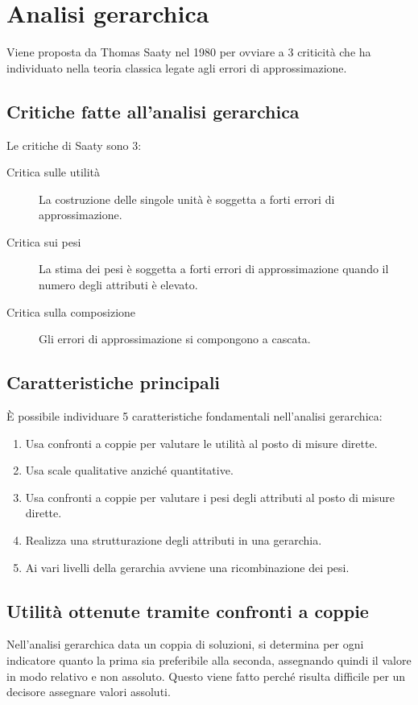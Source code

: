 \documentclass[\main/main.tex]{subfiles}
\begin{document}
\section{Analisi gerarchica}
Viene proposta da Thomas Saaty nel 1980 per ovviare a 3 criticità che ha individuato nella teoria classica legate agli errori di approssimazione.

\subsection{Critiche fatte all'analisi gerarchica}
Le critiche di Saaty sono 3:
\begin{description}
  \item[Critica sulle utilità] La costruzione delle singole unità è soggetta a forti errori di approssimazione.
  \item[Critica sui pesi] La stima dei pesi è soggetta a forti errori di approssimazione quando il numero degli attributi è elevato.
  \item[Critica sulla composizione] Gli errori di approssimazione si compongono a cascata.
\end{description}

\subsection{Caratteristiche principali}
È possibile individuare 5 caratteristiche fondamentali nell'analisi gerarchica:

\begin{enumerate}
  \item Usa confronti a coppie per valutare le utilità al posto di misure dirette.
  \item Usa scale qualitative anziché quantitative.
  \item Usa confronti a coppie per valutare i pesi degli attributi al posto di misure dirette.
  \item Realizza una strutturazione degli attributi in una gerarchia.
  \item Ai vari livelli della gerarchia avviene una ricombinazione dei pesi.
\end{enumerate}

\subsection{Utilità ottenute tramite confronti a coppie}
Nell'analisi gerarchica data un coppia di soluzioni, si determina per ogni indicatore quanto la prima sia preferibile alla seconda, assegnando quindi il valore in modo relativo e non assoluto. Questo viene fatto perché risulta difficile per un decisore assegnare valori assoluti.
\end{document}
